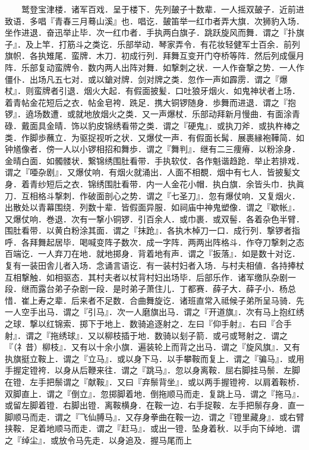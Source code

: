 　　鹫登宝津楼．诸军百戏．呈于楼下．先列皷子十数辈．一人摇双皷子．近前进致语．多唱『青春三月蓦山溪』也．唱讫．皷笛举一红巾者弄大旗．次狮豹入场．坐作进退．奋迅举止毕．次一红巾者．手执两白旗子．跳跃旋风而舞．谓之『扑旗子』．及上竿．打筋斗之类讫．乐部举动．琴家弄令．有花妆轻健军士百余．前列旗帜．各执雉尾．蛮牌．木刀．初成行列．拜舞互变开门夺桥等阵．然后列成偃月阵．乐部复动蛮牌令．数内两人出阵对舞．如撃刺之状．一人作奋撃之势．一人作僵仆．出场凡五七对．或以鎗对牌．剑对牌之类．忽作一声如霹雳．谓之『爆杖』．则蛮牌者引退．烟火大起．有假面披髪．口吐狼牙烟火．如鬼神状者上场．着青帖金花短后之衣．帖金皂袴．跣足．携大铜锣随身．歩舞而进退．谓之『抱锣』．遶场数遭．或就地放烟火之类．又一声爆杖．乐部动拜新月慢曲．有面涂青碌．戴面具金晴．饰以豹皮锦绣看带之类．谓之『硬鬼』．或执刀斧．或执杵棒之类．作脚歩蘸立．为驱捉视听之状．又爆仗一声．有假面长髯．展裹縁袍鞾简．如钟馗像者．傍一人以小锣相招和舞歩．谓之『舞判』．继有二三痩瘠．以粉涂身．金晴白面．如髑髅状．繋锦绣围肚看带．手执软仗．各作魁谐趋跄．举止若排戏．谓之『唖杂剧』．又爆仗响．有烟火就涌出．人面不相覩．烟中有七人．皆披髪文身．着青纱短后之衣．锦绣围肚看带．内一人金花小帽．执白旗．余皆头巾．执眞刀．互相格斗撃刺．作破面剖心之势．谓之『七圣刀』．忽有爆仗响．又复烟火．出散处以青幕围绕．列数十辈．皆假面异服．如祠庙中神鬼塑像．谓之『歇帐』．又爆仗响．巻退．次有一撃小铜锣．引百余人．或巾裹．或双髻．各着杂色半臂．围肚看带．以黄白粉涂其面．谓之『抹跄』．各执木棹刀一口．成行列．撃锣者指呼．各拜舞起居毕．喝喊变阵子数次．成一字阵．两两出阵格斗．作夺刀撃刺之态百端讫．一人弃刀在地．就地掷身．背着地有声．谓之『扳落』．如是数十对讫．复有一装田舎儿者入场．念诵言语讫．有一装村妇者入场．与村夫相値．各持捧杖互相撃触．如相驱态．其村夫者以杖背村妇出场毕．后部乐作．诸军缴队杂剧一段．继而露台弟子杂剧一段．是时弟子萧住儿．丁都赛．薛子大．薛子小．杨总惜．崔上寿之辈．后来者不足数．合曲舞旋讫．诸班直常入祗候子弟所呈马骑．先一人空手出马．谓之『引马』．次一人磨旗出马．谓之『开道旗』．次有马上抱红绣之球．撃以红锦索．掷下于地上．数骑追逐射之．左曰『仰手射』．右曰『合手射』．谓之『拖绣球』．又以柳枝插于地．数骑以刬子箭．或弓或弩射之．谓之『（礻昔）柳枝』．又有以十余小旗．遍装轮上而背之出马．谓之『旋风旗』．又有执旗挺立鞍上．谓之『立马』．或以身下马．以手攀鞍而复上．谓之『骗马』．或用手握定镫袴．以身从后鞭来往．谓之『跳马』．忽以身离鞍．屈右脚挂马鬃．左脚在镫．左手把鬃谓之『献鞍』．又曰『弃鬃背坐』．或以两手握镫袴．以肩着鞍桥．双脚直上．谓之『倒立』．忽掷脚着地．倒拖顺马而走．复跳上马．谓之『拖马』．或留左脚着镫．右脚出镫．离鞍横身．在鞍一边．右手捉鞍．左手把鬃存身．直一脚顺马而走．谓之『飞仙膊马』．又存身拳曲在鞍一边．谓之『镫里藏身』．或右臂挟鞍．足着地顺马而走．谓之『赶马』．或出一镫．坠身着秋．以手向下绰地．谓之『绰尘』．或放令马先走．以身追及．握马尾而上